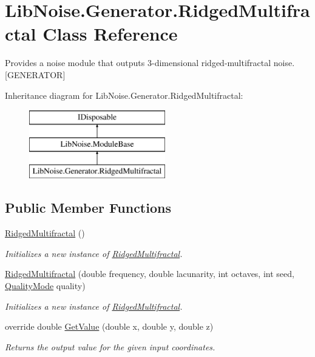 \hypertarget{class_lib_noise_1_1_generator_1_1_ridged_multifractal}{}\section{Lib\+Noise.\+Generator.\+Ridged\+Multifractal Class Reference}
\label{class_lib_noise_1_1_generator_1_1_ridged_multifractal}


Provides a noise module that outputs 3-\/dimensional ridged-\/multifractal noise. \mbox{[}G\+E\+N\+E\+R\+A\+T\+OR\mbox{]}  


Inheritance diagram for Lib\+Noise.\+Generator.\+Ridged\+Multifractal\+:\begin{figure}[H]
\begin{center}
\leavevmode
\includegraphics[height=3.000000cm]{class_lib_noise_1_1_generator_1_1_ridged_multifractal}
\end{center}
\end{figure}
\subsection*{Public Member Functions}
\begin{DoxyCompactItemize}
\item 
\hyperlink{class_lib_noise_1_1_generator_1_1_ridged_multifractal_aaf57d1010e626df3039c167ce3f46804}{Ridged\+Multifractal} ()
\begin{DoxyCompactList}\small\item\em Initializes a new instance of \hyperlink{class_lib_noise_1_1_generator_1_1_ridged_multifractal}{Ridged\+Multifractal}. \end{DoxyCompactList}\item 
\hyperlink{class_lib_noise_1_1_generator_1_1_ridged_multifractal_a3c9c119e0c1cd1d7708dbbc50415c023}{Ridged\+Multifractal} (double frequency, double lacunarity, int octaves, int seed, \hyperlink{namespace_lib_noise_ab253d2180e71b8b4b51e250163ca0e27}{Quality\+Mode} quality)
\begin{DoxyCompactList}\small\item\em Initializes a new instance of \hyperlink{class_lib_noise_1_1_generator_1_1_ridged_multifractal}{Ridged\+Multifractal}. \end{DoxyCompactList}\item 
override double \hyperlink{class_lib_noise_1_1_generator_1_1_ridged_multifractal_a4cd3b3c6b58a0205a96fc4a8359863ae}{Get\+Value} (double x, double y, double z)
\begin{DoxyCompactList}\small\item\em Returns the output value for the given input coordinates. \end{DoxyCompactList}\end{DoxyCompactItemize}
